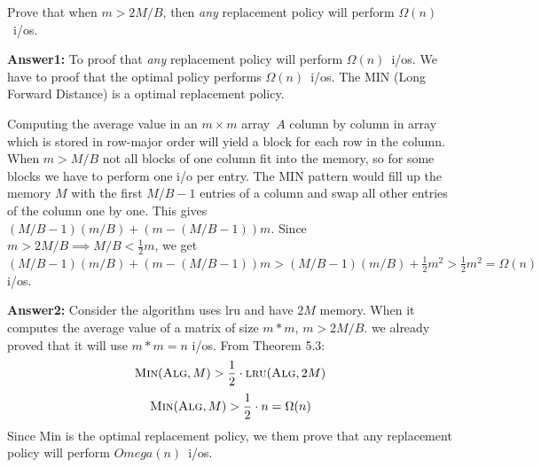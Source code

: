 \documentclass{article}
\newcommand{\alg}{{\sc Alg}\xspace}
\newcommand{\io}{{\sc i/o}\xspace}
\newcommand{\ios}{{\io}s\xspace}
\newcommand{\lru}{{\sc lru}\xspace}
\newcounter{rcounter}
\newenvironment{rlist}%
{\begin{list}{\setnr-\arabic{rcounter}}{\usecounter{rcounter}}}{\end{list}}
\begin{document}
\begin{rlist}
        Prove that when $m>2M/B$, then \emph{any} replacement policy will perform $\Omega(n)$~\ios.
        
        \textbf{Answer1:}
        To proof that \emph{any} replacement policy will perform $\Omega(n)$~\ios. We have to proof that the optimal policy performs $\Omega(n)$~\ios. The MIN (Long Forward Distance) is a optimal replacement policy.
        
        Computing the average value in an $m\times m$ array~$A$ column by column in array which is stored in row-major order will yield a block for each row in the column. When $m>M/B$ not all blocks of one column fit into the memory, so for some blocks we have to perform one \io per entry. The MIN pattern would fill up the memory $M$ with the first $M/B-1$ entries of a column and swap all other entries of the column one by one. This gives $(M/B-1)(m/B)+(m-(M/B-1))m$. Since $m>2M/B \implies M/B < \frac{1}{2}m$, we get $(M/B-1)(m/B)+(m-(M/B-1))m > (M/B-1)(m/B)+\frac{1}{2}m^2 > \frac{1}{2}m^2 = \Omega(n)$ \ios.
        
        \textbf{Answer2:}
        Consider the algorithm uses \lru and have $2M$ memory. When it computes the average value of a matrix of size $m*m$, $m>2M/B$. we already proved that it will use $m*m=n$ \ios.
        From Theorem 5.3:
        $$\textrm{\sc Min}(\textrm{\alg}, M) > \frac{1}{2} \cdot \textrm{\lru}(\textrm{\alg}, 2M)$$
        $$\textrm{\sc Min}(\textrm{\alg}, M) > \frac{1}{2} \cdot n = \Omega(n)$$
        Since {\sc Min} is the optimal replacement policy, we them prove that any replacement policy will perform $Omega(n)$~\ios.
        
        
        
        

\end{rlist}
\end{document}
